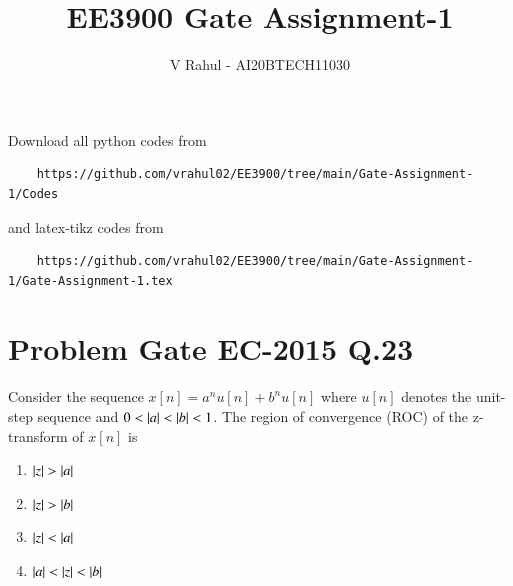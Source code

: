 \documentclass[journal,12pt,twocolumn]{IEEEtran}
\begin{document}
\title{EE3900 Gate Assignment-1}
\author{V Rahul - AI20BTECH11030}
\maketitle
\newpage
\bigskip
\renewcommand{\thefigure}{\theenumi}
\renewcommand{\thetable}{\theenumi}
Download all python codes from 
\begin{lstlisting}
    https://github.com/vrahul02/EE3900/tree/main/Gate-Assignment-1/Codes
\end{lstlisting}
%
and latex-tikz codes from 
%
\begin{lstlisting}
    https://github.com/vrahul02/EE3900/tree/main/Gate-Assignment-1/Gate-Assignment-1.tex
\end{lstlisting}
\section*{Problem Gate EC-2015 Q.23}
Consider the sequence $x[n]=a^nu[n]+b^nu[n]$ where $u[n]$ denotes the unit-step sequence and $0< \vert a\vert< \vert b\vert < 1$. The region of convergence (ROC) of the z-transform of $x[n]$ is\\
\begin{enumerate}
    \item $\vert z\vert> \vert a\vert$
    \item $\vert z\vert> \vert b\vert$
    \item $\vert z\vert< \vert a\vert$
    \item $\vert a\vert<\vert z\vert< \vert b\vert$
\end{enumerate}
\end{document}
